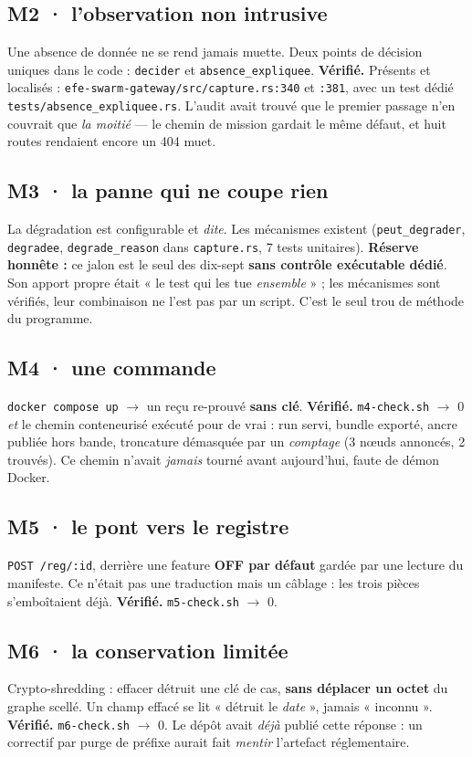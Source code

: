 \documentclass[11pt]{article}
\newcommand{\code}[1]{\texttt{\small #1}}
\newcommand{\moyen}[1]{{\color{efeamber}\textbf{#1}}}
\newcommand{\mm}[1]{\textbf{#1}}
\newcommand{\mesure}[1]{{\color{efeteal}\textbf{Vérifié.} }#1\par}
\begin{document}
\subsection{\mm{M2} · l'observation non intrusive}
Une absence de donnée ne se rend jamais muette. Deux points de décision uniques dans le code :
\code{decider} et \code{absence\_expliquee}.
\mesure{Présents et localisés : \code{efe-swarm-gateway/src/capture.rs:340} et \code{:381}, avec un
test dédié \code{tests/absence\_expliquee.rs}. L'audit avait trouvé que le premier passage n'en
couvrait que \emph{la moitié} --- le chemin de mission gardait le même défaut, et huit routes
rendaient encore un 404 muet.}

\subsection{\mm{M3} · la panne qui ne coupe rien}
La dégradation est configurable et \emph{dite}. Les mécanismes existent (\code{peut\_degrader},
\code{degradee}, \code{degrade\_reason} dans \code{capture.rs}, 7 tests unitaires).
\moyen{Réserve honnête :} ce jalon est le seul des dix-sept \textbf{sans contrôle exécutable
dédié}. Son apport propre était « le test qui les tue \emph{ensemble} » ; les mécanismes sont
vérifiés, leur combinaison ne l'est pas par un script. C'est le seul trou de méthode du programme.

\subsection{\mm{M4} · une commande}
\code{docker compose up} $\rightarrow$ un reçu re-prouvé \textbf{sans clé}.
\mesure{\code{m4-check.sh} $\rightarrow$ 0 \emph{et} le chemin conteneurisé exécuté pour de vrai :
run servi, bundle exporté, ancre publiée hors bande, troncature démasquée par un \emph{comptage}
(3 nœuds annoncés, 2 trouvés). Ce chemin n'avait \emph{jamais} tourné avant aujourd'hui, faute de
démon Docker.}

\subsection{\mm{M5} · le pont vers le registre}
\code{POST /reg/:id}, derrière une feature \textbf{OFF par défaut} gardée par une lecture du
manifeste. Ce n'était pas une traduction mais un câblage : les trois pièces s'emboîtaient déjà.
\mesure{\code{m5-check.sh} $\rightarrow$ 0.}

\subsection{\mm{M6} · la conservation limitée}
Crypto-shredding : effacer détruit une clé de cas, \textbf{sans déplacer un octet} du graphe scellé.
Un champ effacé se lit « détruit le \emph{date} », jamais « inconnu ».
\mesure{\code{m6-check.sh} $\rightarrow$ 0. Le dépôt avait \emph{déjà} publié cette réponse : un
correctif par purge de préfixe aurait fait \emph{mentir} l'artefact réglementaire.}
\end{document}
